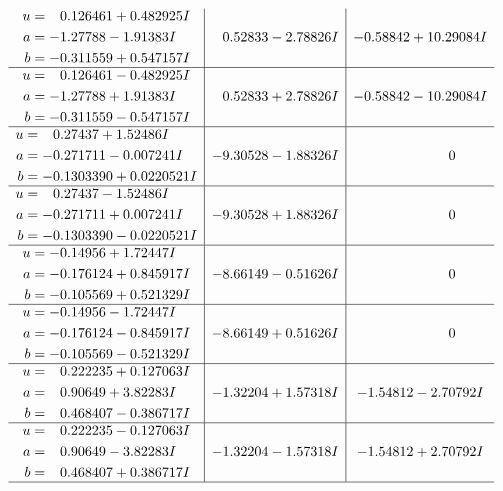 \documentclass[1p]{elsarticle_modified}
\theoremstyle{definition}
\begin{document}
$$\begin{array}{c|c|c}
\begin{aligned}
u &= \phantom{-}0.126461 + 0.482925 I \\
a &= -1.27788 - 1.91383 I \\
b &= -0.311559 + 0.547157 I\end{aligned}
 & \phantom{-}0.52833 - 2.78826 I & -0.58842 + 10.29084 I \\ \hline\begin{aligned}
u &= \phantom{-}0.126461 - 0.482925 I \\
a &= -1.27788 + 1.91383 I \\
b &= -0.311559 - 0.547157 I\end{aligned}
 & \phantom{-}0.52833 + 2.78826 I & -0.58842 - 10.29084 I \\ \hline\begin{aligned}
u &= \phantom{-}0.27437 + 1.52486 I \\
a &= -0.271711 - 0.007241 I \\
b &= -0.1303390 + 0.0220521 I\end{aligned}
 & -9.30528 - 1.88326 I & \phantom{-0.000000 } 0 \\ \hline\begin{aligned}
u &= \phantom{-}0.27437 - 1.52486 I \\
a &= -0.271711 + 0.007241 I \\
b &= -0.1303390 - 0.0220521 I\end{aligned}
 & -9.30528 + 1.88326 I & \phantom{-0.000000 } 0 \\ \hline\begin{aligned}
u &= -0.14956 + 1.72447 I \\
a &= -0.176124 + 0.845917 I \\
b &= -0.105569 + 0.521329 I\end{aligned}
 & -8.66149 - 0.51626 I & \phantom{-0.000000 } 0 \\ \hline\begin{aligned}
u &= -0.14956 - 1.72447 I \\
a &= -0.176124 - 0.845917 I \\
b &= -0.105569 - 0.521329 I\end{aligned}
 & -8.66149 + 0.51626 I & \phantom{-0.000000 } 0 \\ \hline\begin{aligned}
u &= \phantom{-}0.222235 + 0.127063 I \\
a &= \phantom{-}0.90649 + 3.82283 I \\
b &= \phantom{-}0.468407 - 0.386717 I\end{aligned}
 & -1.32204 + 1.57318 I & -1.54812 - 2.70792 I \\ \hline\begin{aligned}
u &= \phantom{-}0.222235 - 0.127063 I \\
a &= \phantom{-}0.90649 - 3.82283 I \\
b &= \phantom{-}0.468407 + 0.386717 I\end{aligned}
 & -1.32204 - 1.57318 I & -1.54812 + 2.70792 I\\
 \hline 
 \end{array}$$\newpage\newpage\renewcommand{\arraystretch}{1}
\end{document}
